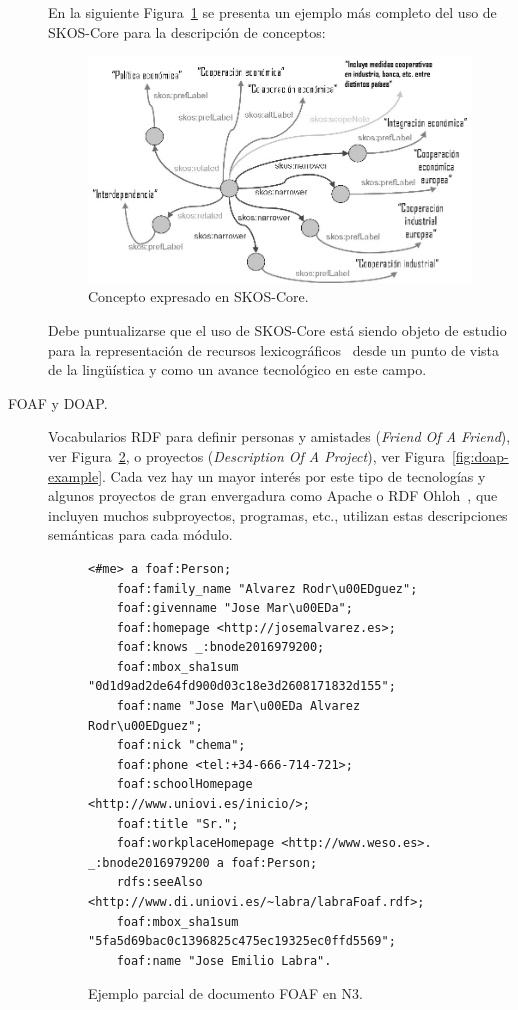 \begin{description}
En la siguiente Figura~\ref{fig:skos} se presenta un ejemplo más completo del
uso de SKOS-Core para la descripción de conceptos:
 
\begin{figure}[!htbp]
\centering
	\includegraphics[width=14cm]{images/skos}
\caption{Concepto expresado en SKOS-Core.}
\label{fig:skos}
\end{figure}

Debe puntualizarse que el uso de SKOS-Core está siendo objeto de estudio para la
representación de recursos lexicográficos~\cite{Milin} desde un punto de vista de la
lingüística y como un avance tecnológico en este campo.

\item[\gls{FOAF} y \gls{DOAP}.] Vocabularios RDF para definir personas y amistades (\textit{Friend Of A Friend}), ver Figura~\ref{fig:foaf-example}, o 
proyectos (\textit{Description Of A Project}), 
ver Figura~\ref{fig:doap-example}. Cada vez hay un mayor interés por este tipo de tecnologías y algunos proyectos de gran envergadura como 
Apache o RDF Ohloh~\cite{Ferndez08rdfohloh}, que incluyen muchos subproyectos, programas, etc., utilizan estas
descripciones semánticas para cada módulo.

\begin{figure}[!htbp]
\centering
  \begin{lstlisting}
<#me> a foaf:Person;
	foaf:family_name "Alvarez Rodr\u00EDguez";
	foaf:givenname "Jose Mar\u00EDa";
	foaf:homepage <http://josemalvarez.es>;
	foaf:knows _:bnode2016979200;
	foaf:mbox_sha1sum "0d1d9ad2de64fd900d03c18e3d2608171832d155";
	foaf:name "Jose Mar\u00EDa Alvarez Rodr\u00EDguez";
	foaf:nick "chema";
	foaf:phone <tel:+34-666-714-721>;
	foaf:schoolHomepage <http://www.uniovi.es/inicio/>;
	foaf:title "Sr.";
	foaf:workplaceHomepage <http://www.weso.es>.
_:bnode2016979200 a foaf:Person;
	rdfs:seeAlso <http://www.di.uniovi.es/~labra/labraFoaf.rdf>;
	foaf:mbox_sha1sum "5fa5d69bac0c1396825c475ec19325ec0ffd5569";
	foaf:name "Jose Emilio Labra".
  \end{lstlisting}
\caption{Ejemplo parcial de documento FOAF en N3.}
\label{fig:foaf-example}
\end{figure}



\end{description}

